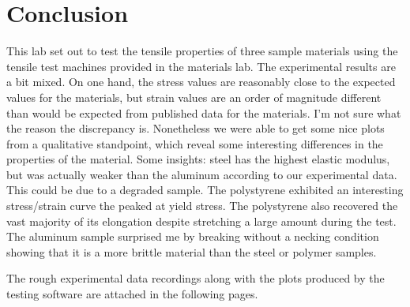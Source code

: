 \documentclass{article}
\begin{document}
\section{Conclusion}
This lab set out to test the tensile properties of three sample materials using the tensile test machines provided in the materials lab. The experimental results are a bit mixed. On one hand, the stress values are reasonably close to the expected values for the materials, but strain values are an order of magnitude different than would be expected from published data for the materials. I'm not sure what the reason the discrepancy is. Nonetheless we were able to get some nice plots from a qualitative standpoint, which reveal some interesting differences in the properties of the material. Some insights: steel has the highest elastic modulus, but was actually weaker than the aluminum according to our experimental data. This could be due to a degraded sample. The polystyrene exhibited an interesting stress/strain curve the peaked at yield stress. The polystyrene also recovered the vast majority of its elongation despite stretching a large amount during the test. The aluminum sample surprised me by breaking without a necking condition showing that it is a more brittle material than the steel or polymer samples.
\vspace{1em}

The rough experimental data recordings along with the plots produced by the testing software are attached in the following pages.
\end{document}
